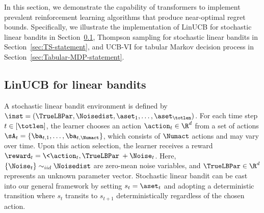 \documentclass[10pt]{article}
\begin{document}
In this section, we demonstrate the capability of transformers to implement prevalent reinforcement learning algorithms that produce near-optimal regret bounds. Specifically, we illustrate the implementation of LinUCB for stochastic linear bandits in Section~\ref{sec:LinUCB-statement}, Thompson sampling for stochastic linear bandits in Section~\ref{sec:TS-statement}, and UCB-VI for tabular Markov decision process in Section~\ref{sec:Tabular-MDP-statement}. %

\subsection{LinUCB for linear bandits}\label{sec:LinUCB-statement}

A stochastic linear bandit environment is defined by $\inst=(\TrueLBPar,\Noisedist,\aset_1,\ldots,\aset_\totlen)$. For each time step $t\in[\totlen]$, the learner chooses an action $\action_t\in\R^{d}$ from a set of actions $\sA_t=\{\ba_{t,1},\ldots,\ba_{t,\Numact}\}$, which consists of $\Numact$ actions and may vary over time. Upon this action selection, the learner receives a reward $\reward_t=\<\action_t,\TrueLBPar\>+\Noise_t$. Here,$\{ \Noise_t \} \sim_{ iid} \Noisedist$ are zero-mean noise variables, and $\TrueLBPar\in\R^{d}$ represents an unknown parameter vector. Stochastic linear bandit can be cast into our general framework by setting $s_t = \aset_t$ and adopting a deterministic transition where $s_t$ transits to $s_{t+1}$ deterministically regardless of the chosen action. 



\end{document}
